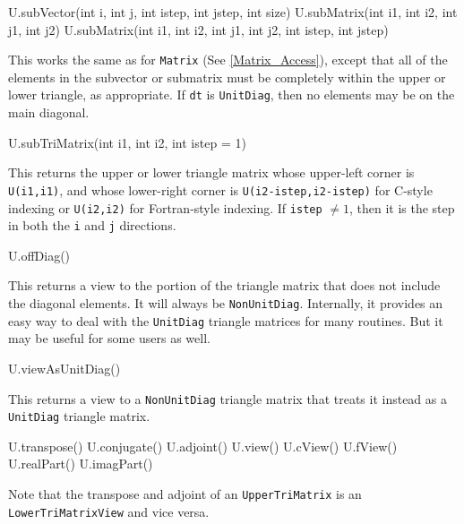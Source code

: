 \documentclass[twoside,letterpaper,11pt]{article}
\renewcommand{\tt}[1]{{\lstinline {#1}}}
\begin{document}
\begin{tmvcode}
U.subVector(int i, int j, int istep, int jstep, int size)
U.subMatrix(int i1, int i2, int j1, int j2)
U.subMatrix(int i1, int i2, int j1, int j2, int istep, int jstep)
\end{tmvcode}
This works the same as for \tt{Matrix}
(See \ref{Matrix_Access}),
except that all of the elements in the 
subvector or submatrix must be completely within the upper or lower triangle, as
appropriate.  If \tt{dt} is \tt{UnitDiag}, then no elements may be on the 
main diagonal.

\begin{tmvcode}
U.subTriMatrix(int i1, int i2, int istep = 1)
\end{tmvcode}
This returns the upper or lower triangle matrix whose upper-left
corner is \tt{U(i1,i1)}, and whose lower-right corner is 
\tt{U(i2-istep,i2-istep)} for C-style indexing or \tt{U(i2,i2)} 
for Fortran-style indexing.  If \tt{istep} $\neq 1$, then it is the 
step in both the \tt{i} and \tt{j} directions.

\begin{tmvcode}
U.offDiag()
\end{tmvcode}
This returns a view to the portion of the triangle matrix that does not include
the diagonal elements.  It will always be \tt{NonUnitDiag}.
Internally, it provides an easy way to deal with the \tt{UnitDiag} triangle matrices
for many routines.  But it may be useful for some users as well.

\begin{tmvcode}
U.viewAsUnitDiag()
\end{tmvcode}
This returns a view to a \tt{NonUnitDiag} triangle matrix that treats it
instead as a \tt{UnitDiag} triangle matrix.

\begin{tmvcode}
U.transpose()
U.conjugate()
U.adjoint()
U.view()
U.cView()
U.fView()
U.realPart()
U.imagPart()
\end{tmvcode}
Note that the transpose and adjoint of an \tt{UpperTriMatrix} is an
\tt{LowerTriMatrixView} and vice versa.
\vspace{12pt}
\end{document}

